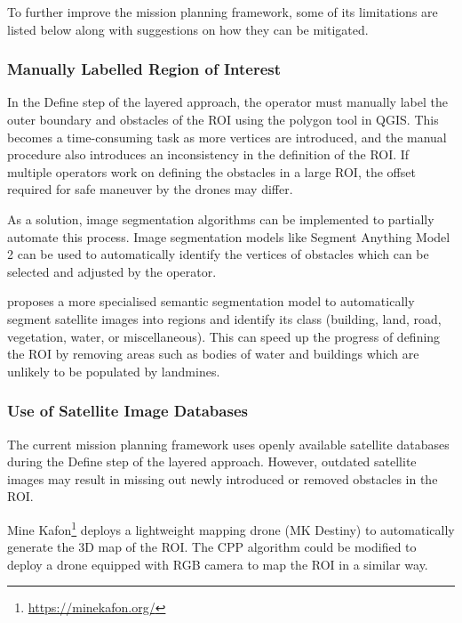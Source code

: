 To further improve the mission planning framework, some of its limitations are listed below along with suggestions on how they can be mitigated. 

\subsubsection{Manually Labelled Region of Interest}

In the Define step of the layered approach, the operator must manually label the outer boundary and obstacles of the \gls{ROI} using the polygon tool in \gls{QGIS}. This becomes a time-consuming task as more vertices are introduced, and the manual procedure also introduces an inconsistency in the definition of the \gls{ROI}. If multiple operators work on defining the obstacles in a large \gls{ROI}, the offset required for safe maneuver by the drones may differ. 

As a solution, image segmentation algorithms can be implemented to partially automate this process. Image segmentation models like Segment Anything Model 2 \cite{ravi2024sam2} can be used to automatically identify the vertices of obstacles which can be selected and adjusted by the operator. 

\cite{patil2022segment} proposes a more specialised semantic segmentation model to automatically segment satellite images into regions and identify its class (building, land, road, vegetation, water, or miscellaneous). This can speed up the progress of defining the \gls{ROI} by removing areas such as bodies of water and buildings which are unlikely to be populated by landmines. 

\subsubsection{Use of Satellite Image Databases}
\label{sec:msp_satellite_database_limitation}

The current mission planning framework uses openly available satellite databases during the Define step of the layered approach. However, outdated satellite images may result in missing out newly introduced or removed obstacles in the \gls{ROI}. 

Mine Kafon\footnote{\url{https://minekafon.org/}} deploys a lightweight mapping drone (MK Destiny) to automatically generate the 3D map of the \gls{ROI}. The \gls{CPP} algorithm could be modified to deploy a drone equipped with RGB camera to map the \gls{ROI} in a similar way.  

